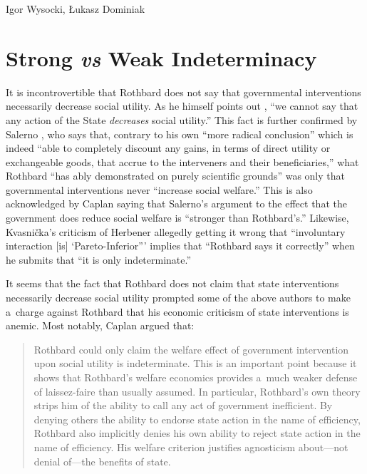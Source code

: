 \begin{artengenv}{Igor Wysocki, Łukasz Dominiak}
\section{Strong \textit{vs} Weak Indeterminacy}

It is incontrovertible that Rothbard does not say that governmental interventions necessarily decrease social utility. As he himself points out 
\parencite[][p.100]{rothbard_praxeology_1976}, %
 ``we cannot say that any action of the State \textit{decreases} social utility.'' This fact is further confirmed by Salerno 
\parencite*[][p.131]{salerno_mises_1993}, %
 who says that, contrary to his own ``more radical conclusion'' which is indeed ``able to completely discount any gains, in terms of direct utility or exchangeable goods, that accrue to the interveners and their beneficiaries,'' what Rothbard ``has ably demonstrated on purely scientific grounds'' was only that governmental interventions never ``increase social welfare.'' 
\parencite[][p.131]{salerno_mises_1993} %
 This is also acknowledged by Caplan 
\parencite*[][p.833]{caplan_austrian_1999} %
 saying that Salerno's argument to the effect that the government does reduce social welfare is ``stronger than Rothbard's.'' Likewise, Kvasnička's 
\parencite*[][p.49]{kvasnicka_rothbards_2008} %
 criticism of Herbener 
\parencite*[][pp.103–104]{herbener_pareto_1997} %
 allegedly getting it wrong that ``involuntary interaction [is] ‘Pareto-Inferior''' implies that ``Rothbard says it correctly'' when he submits that ``it is only indeterminate.'' 
\parencite[][p.49]{kvasnicka_rothbards_2008}%




It seems that the fact that Rothbard does not claim that state interventions necessarily decrease social utility prompted some of the above authors to make a~charge against Rothbard that his economic criticism of state interventions is anemic. Most notably, Caplan 
\parencite*[][p.834]{caplan_austrian_1999} %
 argued that:



\begin{quote}
Rothbard could only claim the welfare effect of government intervention upon social utility is indeterminate. This is an important point because it shows that Rothbard's welfare economics provides a~much weaker defense of laissez-faire than usually assumed. In particular, Rothbard's own theory strips him of the ability to call any act of government inefficient. By denying others the ability to endorse state action in the name of efficiency, Rothbard also implicitly denies his own ability to reject state action in the name of efficiency. His welfare criterion justifies agnosticism about---not denial of---the benefits of state.
\end{quote}




\end{artengenv}

